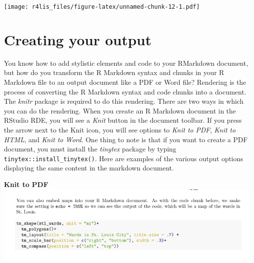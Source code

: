 \documentclass[
  krantz2]{krantz}
\begin{document}
\texttt{[image: r4lis\_files/figure-latex/unnamed-chunk-12-1.pdf]}

\hypertarget{creating-your-output}{%
\section{Creating your output}\label{creating-your-output}}

You know how to add stylistic elements and code to your RMarkdown document, but how do you transform the R Markdown syntax and chunks in your R Markdown file to an output document like a PDF or Word file? Rendering is the process of converting the R Markdown syntax and code chunks into a document. The \emph{knitr} package is required to do this rendering. There are two ways in which you can do the rendering. When you create an R Markdown document in the RStudio RDE, you will see a \emph{Knit} button in the document toolbar. If you press the arrow next to the Knit icon, you will see options to \emph{Knit to PDF}, \emph{Knit to HTML}, and \emph{Knit to Word}. One thing to note is that if you want to create a PDF document, you must install the \emph{tinytex} package by typing \texttt{tinytex::install\_tinytex()}. Here are examples of the various output options displaying the same content in the markdown document.

\textbf{Knit to PDF}
\includegraphics{images/pdf_output1.png}
\end{document}
